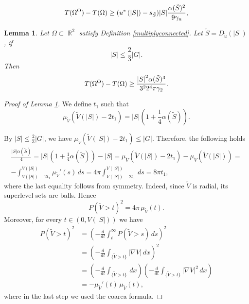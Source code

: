 \documentclass[10pt,a4paper]{amsart}
\newtheorem{lemma}{Lemma}
\newcommand{\OO}{\text{\normalfont  O}}
\DeclareMathOperator{\R}{\mathbb{R}}
\newcommand{\abs}[1]{{\left|#1\right|}}
\begin{document}
    \begin{equation}
        \label{essastorsion}
         T(\Omega^\OO)- T(\Omega)\geq  (u^\ast\left(\abs{S}\right) -s_{\tilde{S}})\abs{S}\frac{\alpha(\tilde{ S})^2}{9\gamma_n},
    \end{equation}

\begin{lemma}\label{lemma5.2}
	Let $\Omega\subset\R^2$ satisfy Definition \ref{multiplyconnected}. Let $\tilde{S}=D_{\tilde u}(\abs{S})$, if
    \[\abs{S}\leq\frac{2}{3}\abs{G}.\]
    Then 
    \begin{equation*}
    T(\Omega^\OO)-T(\Omega) \geq \frac{\abs{S}^2\alpha(\tilde{S})^3}{3^22^4\pi \gamma_ 2}.
\end{equation*}
\end{lemma}

\begin{proof}[Proof of Lemma \ref{lemma5.2}]
    We define $t_1$ such that
    \begin{equation*}
        \mu_{\tilde V}(\tilde V(\abs{S})-2t_1)=\abs{S}\left(1+\frac{1}{4}\alpha(\tilde{S})\right).
    \end{equation*}

        By $\abs{S} \leq \frac{2}{3}\abs{G}$, we have $ \mu_{\tilde V}(\tilde V(\abs{S})-2t_1) \leq \abs{G}$. Therefore,  the following  holds
    \begin{equation*}
        \begin{aligned}
            \frac{\abs{S}\alpha(\tilde{S})}{4}=\abs{S}\left(1+\frac{1}{4}\alpha(\tilde{S})\right)-\abs{S}=\mu_{\tilde V}(\tilde V(\abs{S})-2t_1)-\mu_{\tilde V}(\tilde V(\abs{S}))=\\-\int_{V(\abs{S})-2t_1}^{V(\abs{S})}\mu_{\tilde V}'(s)\,ds=4\pi\int_{V(\abs{S})-2t_1}^{V(\abs{S})}\,ds=8\pi t_1,
        \end{aligned}
    \end{equation*}
 where the last equality follows from symmetry. Indeed, since $\tilde V$ is radial, its superlevel sets are balls. Hence
\begin{equation*}
P(\tilde V>t)^2 = 4\pi\,\mu_{\tilde V}(t).
\end{equation*}
Moreover, for every $t \in (0, V(|S|))$ we have
\begin{equation*}
\begin{aligned}
P(\tilde V>t)^2
&=\left(-\frac{d}{dt}\int_t^\infty P(\tilde V>s)\,ds\right)^2 \\
&=\left(-\frac{d}{dt}\int_{\{\tilde V>t\}}|\nabla V|\,dx\right)^2 \\
&=\left(-\frac{d}{dt}\int_{\{\tilde V>t\}} \,dx\right)
  \left(-\frac{d}{dt}\int_{\{\tilde V>t\}} |\nabla V|^2\,dx\right) \\
&= -\mu_{\tilde V}'(t)\,\mu_{\tilde V}(t),
\end{aligned}
\end{equation*}
where in the last step we used the coarea formula.


\end{proof}
\end{document}
